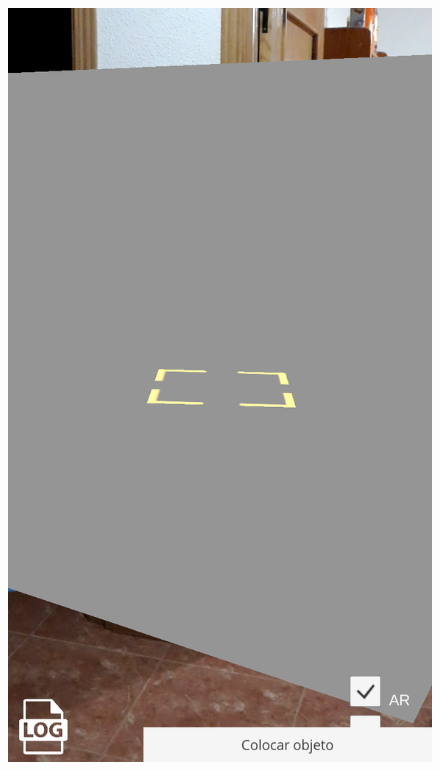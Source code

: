 \begin{figure}[H]
\centering
    \hspace{-4mm}
    \begin{minipage}{0.5\textwidth}
        \centering
        \includegraphics[scale=0.25]{Images/PruebasMapbox/mapboxGPS (1).png}\\
    \end{minipage}
    \begin{minipage}{0.5\textwidth}
        \centering

\end{minipage}
\end{figure}
